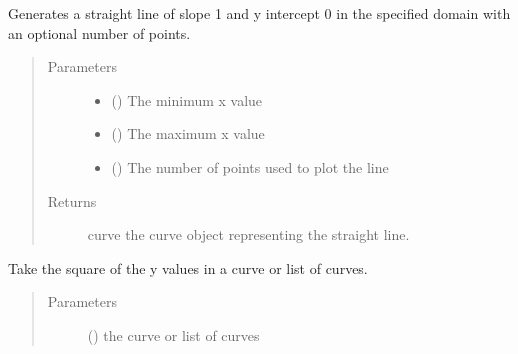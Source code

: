 \documentclass[letterpaper,10pt,english]{sphinxmanual}
\begin{document}
\begin{fulllineitems}
\label{\detokenize{pydv:pydvpy.span}}
Generates a straight line of slope 1 and y intercept 0 in the specified domain with an optional number
of points.

\begin{sphinxVerbatim}[commandchars=\\\{\}]
   
\end{sphinxVerbatim}
\begin{quote}\begin{description}
\item[{Parameters}] \leavevmode\begin{itemize}
\item {} 
 () \textendash{} The minimum x value

\item {} 
 () \textendash{} The maximum x value

\item {} 
 () \textendash{} The number of points used to plot the line

\end{itemize}

\item[{Returns}] \leavevmode
curve \textendash{} the curve object representing the straight line.

\end{description}\end{quote}

\end{fulllineitems}


\begin{fulllineitems}
\label{\detokenize{pydv:pydvpy.sqr}}
Take the square of the y values in a curve or list of curves.
\begin{quote}\begin{description}
\item[{Parameters}] \leavevmode
{} () \textendash{} the curve or list of curves

\end{description}\end{quote}

\end{fulllineitems}
\end{document}
